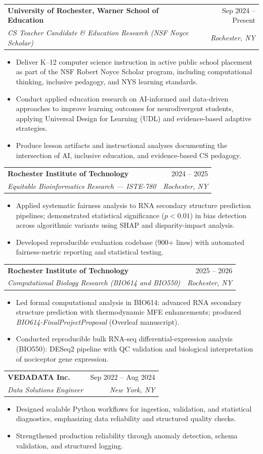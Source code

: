 \documentclass[11pt]{article}
\makeatletter
\newcommand{\entry}[4]{
  \noindent\begin{tabularx}{\textwidth}{@{}Xr@{}}
    \textbf{#1} & #2 \\
    \textit{#3} & \textit{#4}
  \end{tabularx}\vspace{2pt}
}
\makeatother
\begin{document}
\entry{University of Rochester, Warner School of Education}{Sep 2024 -- Present}{CS Teacher Candidate \& Education Research (NSF Noyce Scholar)}{Rochester, NY}
\begin{itemize}
  \item Deliver K--12 computer science instruction in active public school placement as part of the NSF Robert Noyce Scholar program, including computational thinking, inclusive pedagogy, and NYS learning standards.
  \item Conduct applied education research on AI-informed and data-driven approaches to improve learning outcomes for neurodivergent students, applying Universal Design for Learning (UDL) and evidence-based adaptive strategies.
  \item Produce lesson artifacts and instructional analyses documenting the intersection of AI, inclusive education, and evidence-based CS pedagogy.
\end{itemize}

\entry{Rochester Institute of Technology}{2024 -- 2025}{Equitable Bioinformatics Research --- ISTE-780}{Rochester, NY}
\begin{itemize}
  \item Applied systematic fairness analysis to RNA secondary structure prediction pipelines; demonstrated statistical significance ($p < 0.01$) in bias detection across algorithmic variants using SHAP and disparity-impact analysis.
  \item Developed reproducible evaluation codebase (900+ lines) with automated fairness-metric reporting and statistical testing.
\end{itemize}

\entry{Rochester Institute of Technology}{2025 -- 2026}{Computational Biology Research (BIO614 and BIO550)}{Rochester, NY}
\begin{itemize}
  \item Led formal computational analysis in BIO614: advanced RNA secondary structure prediction with thermodynamic MFE enhancements; produced \textit{BIO614-FinalProjectProposal} (Overleaf manuscript).
  \item Conducted reproducible bulk RNA-seq differential-expression analysis (BIO550): DESeq2 pipeline with QC validation and biological interpretation of nociceptor gene expression.
\end{itemize}

\entry{VEDADATA Inc.}{Sep 2022 -- Aug 2024}{Data Solutions Engineer}{New York, NY}
\begin{itemize}
  \item Designed scalable Python workflows for ingestion, validation, and statistical diagnostics, emphasizing data reliability and structured quality checks.
  \item Strengthened production reliability through anomaly detection, schema validation, and structured logging.
\end{itemize}
\end{document}
